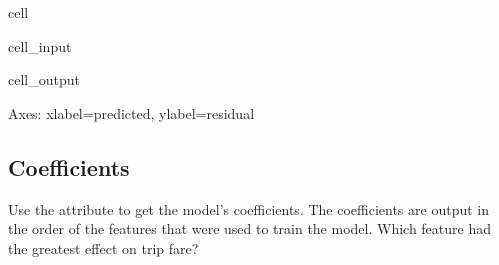 \documentclass[letterpaper,10pt,english]{sphinxmanual}
\begin{document}
\begin{sphinxuseclass}{cell}
\begin{sphinxuseclass}{cell_input}
\begin{sphinxVerbatim}[commandchars=\\\{\}]
      
\end{sphinxVerbatim}

\end{sphinxuseclass}
\begin{sphinxuseclass}{cell_output}
\begin{sphinxVerbatim}[commandchars=\\\{\}]
\PYGZlt{}Axes: xlabel=\PYGZsq{}predicted\PYGZsq{}, ylabel=\PYGZsq{}residual\PYGZsq{}\PYGZgt{}
\end{sphinxVerbatim}

\noindent{}

\end{sphinxuseclass}
\end{sphinxuseclass}

\subsection{Coefficients}
\label{\detokenize{Automatidata_Regression Analysis:coefficients}}
\sphinxAtStartPar
Use the  attribute to get the model’s coefficients. The coefficients are output in the order of the features that were used to train the model. Which feature had the greatest effect on trip fare?
\end{document}
